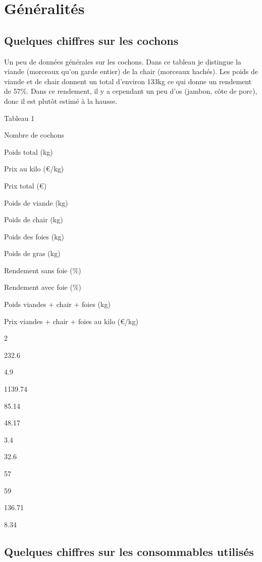 \documentclass[]{article}
\begin{document}
\hypertarget{generalites}{%
\section{Généralités}\label{generalites}}

\hypertarget{quelques-chiffres-sur-les-cochons}{%
\subsection{Quelques chiffres sur les
cochons}\label{quelques-chiffres-sur-les-cochons}}

Un peu de données générales sur les cochons. Dans ce tableau je
distingue la viande (morceaux qu'on garde entier) de la chair (morceaux
hachés). Les poids de viande et de chair donnent un total d'environ
133kg ce qui donne un rendement de 57\%. Dans ce rendement, il y a
cependant un peu d'os (jambon, côte de porc), donc il est plutôt estimé
à la hausse.

Tableau 1

Nombre de cochons

Poids total (kg)

Prix au kilo (€/kg)

Prix total (€)

Poids de viande (kg)

Poids de chair (kg)

Poids des foies (kg)

Poids de gras (kg)

Rendement sans foie (\%)

Rendement avec foie (\%)

Poids viandes + chair + foies (kg)

Prix viandes + chair + foies au kilo (€/kg)

2

232.6

4.9

1139.74

85.14

48.17

3.4

32.6

57

59

136.71

8.34

\hypertarget{quelques-chiffres-sur-les-consommables-utilises}{%
\subsection{Quelques chiffres sur les consommables
utilisés}\label{quelques-chiffres-sur-les-consommables-utilises}}
\end{document}
